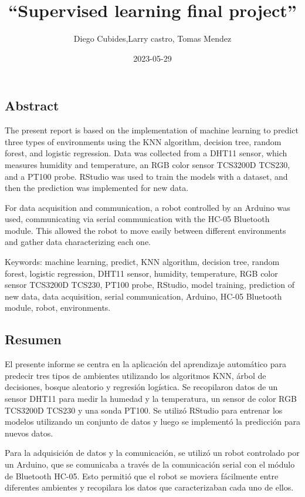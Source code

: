 \documentclass[
]{article}
\title{``Supervised learning final project''}
\author{Diego Cubides,Larry castro, Tomas Mendez}
\date{2023-05-29}
\begin{document}
\maketitle

\hypertarget{abstract}{%
\subsection{Abstract}\label{abstract}}

The present report is based on the implementation of machine learning to
predict three types of environments using the KNN algorithm, decision
tree, random forest, and logistic regression. Data was collected from a
DHT11 sensor, which measures humidity and temperature, an RGB color
sensor TCS3200D TCS230, and a PT100 probe. RStudio was used to train the
models with a dataset, and then the prediction was implemented for new
data.

For data acquisition and communication, a robot controlled by an Arduino
was used, communicating via serial communication with the HC-05
Bluetooth module. This allowed the robot to move easily between
different environments and gather data characterizing each one.

Keywords: machine learning, predict, KNN algorithm, decision tree,
random forest, logistic regression, DHT11 sensor, humidity, temperature,
RGB color sensor TCS3200D TCS230, PT100 probe, RStudio, model training,
prediction of new data, data acquisition, serial communication, Arduino,
HC-05 Bluetooth module, robot, environments.

\hypertarget{resumen}{%
\subsection{Resumen}\label{resumen}}

El presente informe se centra en la aplicación del aprendizaje
automático para predecir tres tipos de ambientes utilizando los
algoritmos KNN, árbol de decisiones, bosque aleatorio y regresión
logística. Se recopilaron datos de un sensor DHT11 para medir la humedad
y la temperatura, un sensor de color RGB TCS3200D TCS230 y una sonda
PT100. Se utilizó RStudio para entrenar los modelos utilizando un
conjunto de datos y luego se implementó la predicción para nuevos datos.

Para la adquisición de datos y la comunicación, se utilizó un robot
controlado por un Arduino, que se comunicaba a través de la comunicación
serial con el módulo de Bluetooth HC-05. Esto permitió que el robot se
moviera fácilmente entre diferentes ambientes y recopilara los datos que
caracterizaban cada uno de ellos.
\end{document}
